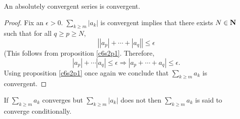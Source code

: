 \begin{prop}\label{c6s2p2}
An absolutely convergent series is convergent.
\end{prop}
\begin{proof}
Fix an $\epsilon > 0$. $\sum_{k \ge m}|a_k|$ is convergent implies that
there exists $N \in \mathbf{N}$ such that for all $q \ge p \ge N$,
\[
\left||a_p| + \cdots + |a_q|\right| \le \epsilon
\]
(This follows from proposition \ref{c6s2p1}. Therefore,
\[
|a_p| + \cdots |a_q| \le \epsilon \Rightarrow |a_p + \cdots + a_q| \le
\epsilon.
\]
Using proposition \ref{c6s2p1} once again we conclude that $\sum_{k \ge m}
a_k$ is convergent.
\end{proof}

\begin{defn}\label{c6s2d6}
If $\sum_{k \ge m}a_k$ converges but $\sum_{k \ge m}|a_k|$ does not then
$\sum_{k \ge m}a_k$ is said to converge conditionally.
\end{defn}


